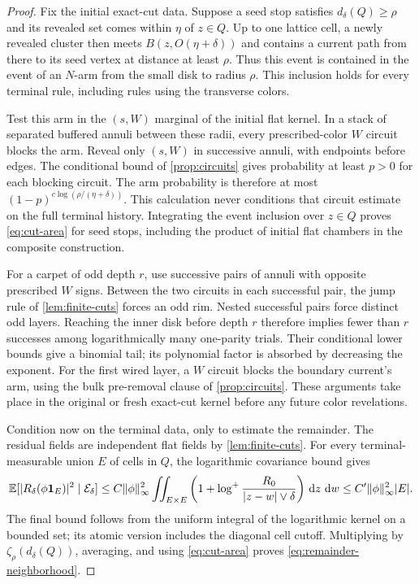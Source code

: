 \begin{proof}
Fix the initial exact-cut data. Suppose a seed stop satisfies
\(d_\delta(Q)\ge\rho\) and its revealed set comes within \(\eta\) of
\(z\in Q\). Up to one lattice cell, a newly revealed cluster then meets
\(B(z,O(\eta+\delta))\) and contains a current path from there to its
seed vertex at distance at least \(\rho\). Thus this event is contained
in the event of an \(N\)-arm from the small disk to radius \(\rho\).
This inclusion holds for every terminal rule, including rules using
the transverse colors.

Test this arm in the \((s,W)\) marginal of the initial flat kernel.
In a stack of separated buffered annuli between these radii, every
prescribed-color \(W\) circuit blocks the arm. Reveal only \((s,W)\)
in successive annuli, with endpoints before edges. The conditional
bound of \cref{prop:circuits} gives probability at least \(p>0\) for
each blocking circuit. The arm probability is therefore at most
\((1-p)^{c\log(\rho/(\eta+\delta))}\). This calculation never
conditions that circuit estimate on the full terminal history.
Integrating the event inclusion over \(z\in Q\) proves
\eqref{eq:cut-area} for seed stops, including the product of initial
flat chambers in the composite construction.

For a carpet of odd depth \(r\), use successive pairs of annuli with
opposite prescribed \(W\) signs. Between the two circuits in each
successful pair, the jump rule of \cref{lem:finite-cuts} forces an odd
rim. Nested successful pairs force distinct odd layers. Reaching the
inner disk before depth \(r\) therefore implies fewer than \(r\)
successes among logarithmically many one-parity trials. Their
conditional lower bounds give a binomial tail; its polynomial factor
is absorbed by decreasing the exponent. For the first wired layer,
a \(W\) circuit blocks the boundary current's arm, using the bulk
pre-removal clause of \cref{prop:circuits}. These arguments take place
in the original or fresh exact-cut kernel before any future color
revelations.

Condition now on the terminal data, only to estimate the remainder.
The residual fields are independent flat fields by
\cref{lem:finite-cuts}. For every terminal-measurable union \(E\) of
cells in \(Q\), the logarithmic covariance bound gives
\begin{equation}
 \mathbb E[|R_\delta(\phi\mathbf 1_E)|^2\mid\mathcal E_\delta]
 \le C\|\phi\|_\infty^2
 \iint_{E\times E}\left(1+\log^+
          \frac{R_0}{|z-w|\vee\delta}\right)\,\mathrm d z\,\,\mathrm d w
 \le C'\|\phi\|_\infty^2|E|.
 \label{eq:random-neighborhood-green}
\end{equation}
The final bound follows from the uniform integral of the logarithmic
kernel on a bounded set; its atomic version includes the diagonal
cell cutoff. Multiplying by \(\zeta_\rho(d_\delta(Q))\), averaging, and
using \eqref{eq:cut-area} proves
\eqref{eq:remainder-neighborhood}.


\end{proof}
